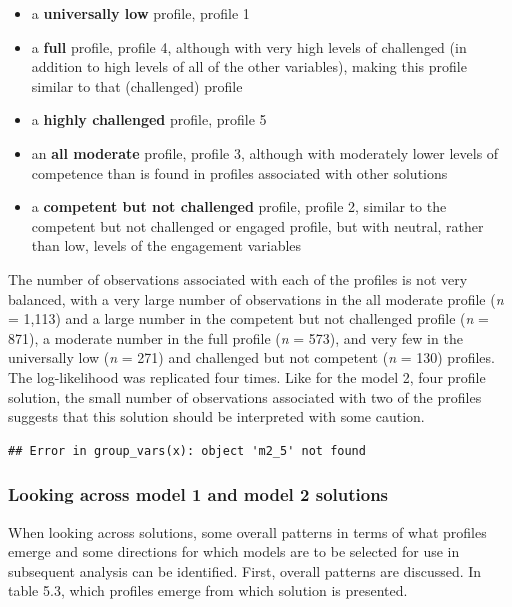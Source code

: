 \documentclass[]{book}
\providecommand{\tightlist}{%
  \setlength{\itemsep}{0pt}\setlength{\parskip}{0pt}}
\theoremstyle{definition}
\theoremstyle{definition}
\theoremstyle{definition}
\theoremstyle{remark}
\begin{document}
\begin{itemize}
\tightlist
\item
  a \textbf{universally low} profile, profile 1
\item
  a \textbf{full} profile, profile 4, although with very high levels of
  challenged (in addition to high levels of all of the other variables),
  making this profile similar to that (challenged) profile
\item
  a \textbf{highly challenged} profile, profile 5
\item
  an \textbf{all moderate} profile, profile 3, although with moderately
  lower levels of competence than is found in profiles associated with
  other solutions
\item
  a \textbf{competent but not challenged} profile, profile 2, similar to
  the competent but not challenged or engaged profile, but with neutral,
  rather than low, levels of the engagement variables
\end{itemize}

The number of observations associated with each of the profiles is not
very balanced, with a very large number of observations in the all
moderate profile (\emph{n} = 1,113) and a large number in the competent
but not challenged profile (\emph{n} = 871), a moderate number in the
full profile (\emph{n} = 573), and very few in the universally low
(\emph{n} = 271) and challenged but not competent (\emph{n} = 130)
profiles. The log-likelihood was replicated four times. Like for the
model 2, four profile solution, the small number of observations
associated with two of the profiles suggests that this solution should
be interpreted with some caution.

\begin{verbatim}
## Error in group_vars(x): object 'm2_5' not found
\end{verbatim}

\subsubsection{Looking across model 1 and model 2
solutions}\label{looking-across-model-1-and-model-2-solutions}

When looking across solutions, some overall patterns in terms of what
profiles emerge and some directions for which models are to be selected
for use in subsequent analysis can be identified. First, overall
patterns are discussed. In table 5.3, which profiles emerge from which
solution is presented.
\end{document}
